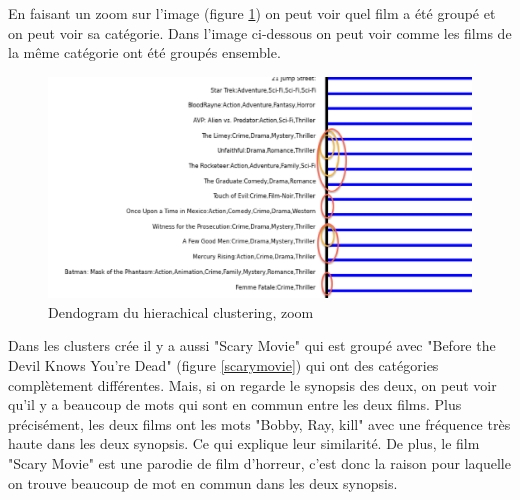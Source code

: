 En faisant un zoom sur l'image (figure \ref{zoom}) on peut voir quel film a été groupé et on peut voir sa catégorie. Dans l'image ci-dessous on peut voir comme les films de la même catégorie ont été groupés ensemble.

\begin{figure}[h]
  \centering
    \includegraphics[width=1\linewidth]{img/zoom.png}
  \caption{Dendogram du hierachical clustering, zoom}
  \label{zoom}
\end{figure}
\newpage
Dans les clusters crée il y a aussi "Scary Movie" qui est groupé avec "Before the Devil Knows You're Dead" (figure \ref{scarymovie}) qui ont des catégories complètement différentes. Mais, si on regarde le synopsis des deux, on peut voir qu’il y a beaucoup de mots qui sont en commun entre les deux films. Plus précisément, les deux films ont les mots "Bobby, Ray, kill" avec une fréquence très haute dans les deux synopsis. Ce qui explique leur similarité. De plus, le film "Scary Movie" est une parodie de film d'horreur, c'est donc la raison pour laquelle on trouve beaucoup de mot en commun dans les deux synopsis.
 
